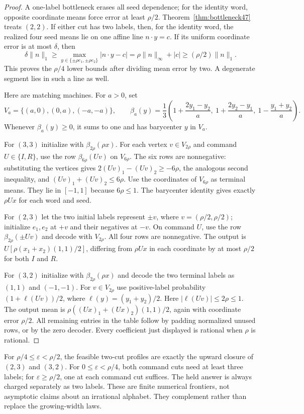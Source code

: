 \begin{proof}
A one-label bottleneck erases all seed dependence; for the identity
word, opposite coordinate means force error at least $\rho/2$.
Theorem~\ref{thm:bottleneck47} treats $(2,2)$.
If either cut has two labels, then, for the identity word, the realized
four seed means lie on one affine line $n\cdot y=c$. If its uniform
coordinate error is at most $\delta$, then
\[
 \delta\|n\|_1\ge
 \max_{y\in\{\pm\rho e_1,\pm\rho e_2\}}|n\cdot y-c|
 =\rho\|n\|_\infty+|c|
 \ge(\rho/2)\|n\|_1.
\]
This proves the $\rho/4$ lower bounds after dividing mean error by two.
A degenerate segment lies in such a line as well.

Here are matching machines. For $a>0$, set
\[
 V_a=\{(a,0),(0,a),(-a,-a)\},\qquad
 \beta_a(y)=\frac13
 \left(1+\frac{2y_1-y_2}{a},\
       1+\frac{2y_2-y_1}{a},\
       1-\frac{y_1+y_2}{a}\right).
\]
Whenever $\beta_a(y)\ge0$, it sums to one and has barycenter $y$
in $V_a$.

For $(3,3)$ initialize with $\beta_{2\rho}(\rho x)$.
For each vertex $v\in V_{2\rho}$ and command $U\in\{I,R\}$,
use the row $\beta_{6\rho}(Uv)$ on $V_{6\rho}$.
The six rows are nonnegative: substituting the vertices gives
$2(Uv)_1-(Uv)_2\ge-6\rho$, the analogous second inequality,
and $(Uv)_1+(Uv)_2\le6\rho$.
Use the coordinates of $V_{6\rho}$ as terminal means. They lie in
$[-1,1]$ because $6\rho\le1$. The barycenter identity gives exactly
$\rho Ux$ for each word and seed.

For $(2,3)$ let the two initial labels represent
$\pm v$, where $v=(\rho/2,\rho/2)$; initialize $e_1,e_2$ at $+v$
and their negatives at $-v$. On command $U$, use the row
$\beta_{2\rho}(\pm Uv)$ and decode with $V_{2\rho}$.
All four rows are nonnegative. The output is
$U[\rho(x_1+x_2)(1,1)/2]$, differing from $\rho Ux$ in each
coordinate by at most $\rho/2$ for both $I$ and $R$.

For $(3,2)$ initialize with $\beta_{2\rho}(\rho x)$ and decode the
two terminal labels as $(1,1)$ and $(-1,-1)$.
For $v\in V_{2\rho}$ use positive-label probability
$(1+\ell(Uv))/2$, where $\ell(y)=(y_1+y_2)/2$.
Here $|\ell(Uv)|\le2\rho\le1$. The output mean is
$\rho((Ux)_1+(Ux)_2)(1,1)/2$, again with coordinate error $\rho/2$.
All remaining entries in the table follow by padding normalized unused
rows, or by the zero decoder. Every coefficient just displayed is
rational when $\rho$ is rational.
\end{proof}

For $\rho/4\le\varepsilon<\rho/2$, the feasible two-cut profiles
are exactly the upward closure of $(2,3)$ and $(3,2)$.
For $0\le\varepsilon<\rho/4$, both command cuts need at least three
labels; for $\varepsilon\ge\rho/2$, one at each command cut suffices.
The held answer is always charged separately as two labels. These are
finite numerical frontiers, not asymptotic claims about an irrational
alphabet. They complement rather than replace the growing-width laws.

